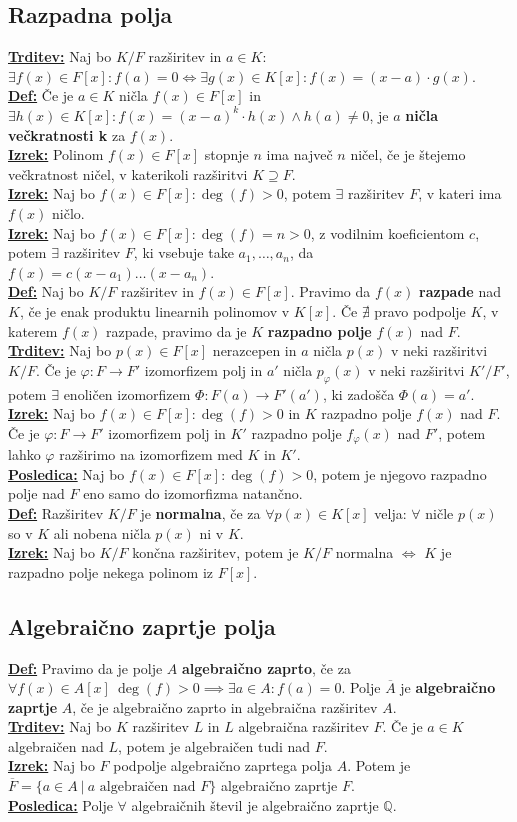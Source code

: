 \documentclass[a4paper,oneside,8pt,landscape]{extarticle}
\renewcommand{\phi}{\varphi}
\let\oldtextbf\textbf
\renewcommand{\textbf}[1]{\oldtextbf{\boldmath #1}}
\newcommand{\definicija}[1]{\textbf{\underline{Def:} }{#1}\\}
\newcommand{\trditev}[1]{\textbf{\underline{Trditev:} }{#1}\\}
\newcommand{\posledica}[1]{\textbf{\underline{Posledica:} }{#1}\\}
\newcommand{\izrek}[1]{\textbf{\underline{Izrek:} }{#1}\\}
\newcommand{\bt}[1]{\textbf{#1}}
\begin{document}
\begin{multicols*}{3}
\subsection*{Razpadna polja}
\trditev{Naj bo $K/F$ razširitev in $a\in K$: $\exists f(x)\in F[x]: f(a) = 0 \iff \exists g(x)\in K[x] : f(x) = (x-a)\cdot g(x)$.}
\definicija{Če je $a\in K$ ničla $f(x)\in F[x]$ in $\exists h(x)\in K[x] : f(x) = (x-a)^k\cdot h(x) \land h(a) \neq 0$, je $a$ \bt{ničla večkratnosti k} za $f(x)$.}
\izrek{Polinom $f(x)\in F[x]$ stopnje $n$ ima največ $n$ ničel, če je štejemo večkratnost ničel, v katerikoli razširitvi $K\supseteq F$.}
\izrek{Naj bo $f(x)\in F[x]:\deg(f) > 0$, potem $\exists$ razširitev $F$, v kateri ima $f(x)$ ničlo.}
\izrek{Naj bo $f(x)\in F[x]: \deg(f) = n >0$, z vodilnim koeficientom $c$, potem $\exists$ razširitev $F$, ki vsebuje take $a_1,\dots , a_n$, da $f(x) =c(x-a_1)\dots (x-a_n)$.}
\definicija{Naj bo $K/F$ razširitev in $f(x)\in F[x]$. Pravimo da $f(x)$ \bt{razpade} nad $K$, če je enak produktu linearnih polinomov v $K[x]$. Če $\nexists$ pravo podpolje $K$, v katerem $f(x)$ razpade, pravimo da je $K$ \bt{razpadno polje} $f(x)$ nad $F$.}
\trditev{Naj bo $p(x)\in F[x]$ nerazcepen in $a$ ničla $p(x)$ v neki razširitvi $K/F$. Če je $\phi:F\to F'$ izomorfizem polj in $a'$ ničla $p_{\phi}(x)$ v neki razširitvi $K'/F'$, potem $\exists$ enoličen izomorfizem $\Phi : F(a)\to F'(a')$, ki zadošča $\Phi(a)=a'$.}
\izrek{Naj bo $f(x)\in F[x]:\deg(f)>0$ in $K$ razpadno polje $f(x)$ nad $F$. Če je $\phi : F\to F'$ izomorfizem polj in $K'$ razpadno polje $f_{\phi}(x)$ nad $F'$, potem lahko $\phi$ razširimo na izomorfizem med $K$ in $K'$.}
\posledica{Naj bo $f(x)\in F[x]:\deg(f)>0$, potem je njegovo razpadno polje nad $F$ eno samo do izomorfizma natančno.}
\definicija{Razširitev $K/F$ je \bt{normalna}, če za $\forall p(x)\in K[x]$ velja: $\forall$ ničle $p(x)$ so v $K$ ali nobena ničla $p(x)$ ni v $K$.}
\izrek{Naj bo $K/F$ končna razširitev, potem je $K/F$ normalna $\iff$ $K$ je razpadno polje nekega polinom iz $F[x]$.}
\vspace{-15pt}
\subsection*{Algebraično zaprtje polja}
\definicija{Pravimo da je polje $A$ \bt{algebraično zaprto}, če za $\forall f(x)\in A[x]\ \deg(f) > 0 \implies  \exists a\in A: f(a) =0$. Polje $\overline{A}$ je \bt{algebraično zaprtje} $A$, če je algebraično zaprto in algebraična razširitev $A$.}
\trditev{Naj bo $K$ razširitev $L$ in $L$ algebraična razširitev $F$. Če je $a\in K$ algebraičen nad $L$, potem je algebraičen tudi nad $F$.}
\izrek{Naj bo $F$ podpolje algebraično zaprtega polja $A$. Potem je $\overline{F} = \{ a\in A \  | \ a \text{ algebraičen nad } F\}$ algebraično zaprtje $F$.}
\posledica{Polje $\forall$ algebraičnih števil je algebraično zaprtje $\mathbb{Q}$.}
\vspace{-15pt}

\end{multicols*}
\end{document}
